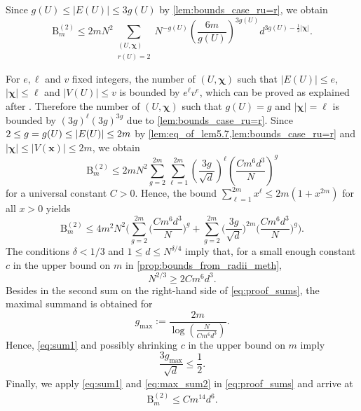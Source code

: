 \documentclass[11pt]{article}
\newcommand{\abs}[1]{\left| #1 \right|}
\newcommand{\patx}{\boldsymbol{x}}
\newcommand{\patchi}{\boldsymbol{\chi}}
\theoremstyle{plain}
\theoremstyle{remark}
\numberwithin{equation}{section}
\newcommand{\nc}{\normalcolor}
\begin{document}
Since $g(U) \leq \abs{E(U)} \leq 3 g(U)$ by \cref{lem:bounds_case_ru=r}, we obtain
\begin{equation*}
    \mathrm{B}_{m}^{(2)}\leq 2m N^2\sum_{\substack{(U,\patchi)\\ r(U)=2}} N^{-g(U)} \left(\frac{6m}{g(U)}\right)^{3g(U)}d^{3g(U) - \frac{1}{2}|\patchi|}. 
\end{equation*}

For $e,\ell$ and $v$ fixed integers, the number of $(U,\patchi)$ such that $|E(U)| \le e$, $|\patchi| \le \ell$ and $|V(U)| \le v$ is bounded by $e^\ell v^e$, which can be proved as explained after 
\cite[proof of Lemma~5.8]{BBK_spec_radii}.  Therefore the number of $(U,\patchi)$ such that $g(U)=g$ and $|\patchi|= \ell$ is bounded by $(3g)^\ell (3g)^{3g}$ due to \cref{lem:bounds_case_ru=r}. 
Since $2 \leq \nc g=g(U) \leq \abs{E(U)} \leq 2m$ by \cref{lem:eq_of_lem5.7,lem:bounds_case_ru=r} and $\abs{\patchi} \leq \abs{V(\patx)} \leq 2m$, we obtain 
\begin{equation*}
       \mathrm{B}_{m}^{(2)} \leq 2m N^2\sum_{g=2}^{2m}\sum_{\ell=1}^{2m}\left(\frac{3g}{\sqrt{d}}\right)^\ell \left(\frac{C m^6d^3}{N}\right)^g 
\end{equation*}
 for a universal constant $C>0$. Hence, the bound $\sum_{\ell=1}^{2m} x^\ell \le 2m(1+x^{2m}) $ for all $x>0$ yields 
\begin{equation} \label{eq:proof_sums} 
    \mathrm{B}_{m}^{(2)} \le 4m^2 N^{2} \biggl(   \sum_{g=2}^{2m}  \biggl(\frac{C m^6d^3}{N}\biggr)^g + \sum_{g=2}^{2m}\biggl(\frac{3g}{\sqrt{d}}\biggr)^{2m} \biggl(\frac{C m^6d^3}{N}\biggr)^g \biggr).
\end{equation}
The conditions $\delta < 1/3$ and $1 \le d \le N^{\delta /4}$ imply that, for a small enough constant $c$ in the upper bound on $m$ in \cref{prop:bounds_from_radii_meth},  
\begin{equation}\label{eq:sum1}
    N^{2/3} \ge2 Cm^6d^3.
\end{equation}
Besides in the second sum on the right-hand side of \cref{eq:proof_sums}, the maximal summand is obtained for 
$$g_{\max}:= \frac{2m}{\log \left(\frac{N}{C m^6d^3}\right)}.$$
Hence, \cref{eq:sum1} and possibly shrinking $c$ in the upper bound on $m$ imply 
\begin{equation}\label{eq:max_sum2}
    \frac{3g_{\max}}{\sqrt{d}} \le \frac{1}{2}.
\end{equation}
Finally, we apply \cref{eq:sum1} and \cref{eq:max_sum2} in \cref{eq:proof_sums} and arrive at   
\begin{align}\label{eq:up_bound_for_B^1}
    \mathrm{B}_{m}^{(2)} \le C m^{14} d^{6}.
\end{align}
\end{document}

